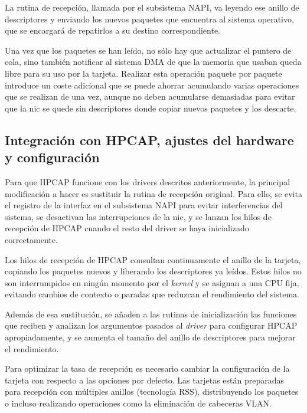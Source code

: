 \documentclass[twoside, 12pt, draft]{epstfg}
\begin{document}
La rutina de recepción, llamada por el subsistema \gls{NAPI}, va leyendo ese anillo de descriptores y enviando los nuevos paquetes que encuentra al sistema operativo, que se encargará de repatirlos a su destino correspondiente.

Una vez que los paquetes se han leído, no sólo hay que actualizar el puntero de cola, sino también notificar al sistema \gls{DMA} de que la memoria que usaban queda libre para su uso por la tarjeta. Realizar esta operación paquete por paquete introduce un coste adicional que se puede ahorrar acumulando varias operaciones que se realizan de una vez, aunque no deben acumularse demasiadas para evitar que la \gls{nic} se quede sin descriptores donde copiar nuevos paquetes y los descarte.


\subsection{Integración con HPCAP, ajustes del hardware y configuración}
\label{sec:Desarrollo:AjustesHardware}

Para que HPCAP funcione con los \glspl{driver} descritos anteriormente, la principal modificación a hacer es sustituir la rutina de recepción original. Para ello, se evita el registro de la interfaz en el subsistema \gls{NAPI} para evitar interferencias del sistema, se desactivan las interrupciones de la \gls{nic}, y se lanzan los hilos de recepción de HPCAP cuando el resto del \gls{driver} se haya inicializado correctamente.

Los hilos de recepción de HPCAP consultan continuamente el anillo de la tarjeta, copiando los paquetes nuevos y liberando los descriptores ya leídos. Estos hilos no son interrumpidos en ningún momento por el \textit{kernel} y se asignan a una CPU fija, evitando cambios de contexto o paradas que reduzcan el rendimiento del sistema.

Además de esa sustitución, se añaden a las rutinas de inicialización las funciones que reciben y analizan los argumentos pasados al \textit{driver} para configurar HPCAP apropiadamente, y se aumenta el tamaño del anillo de descriptores para mejorar el rendimiento.

Para optimizar la tasa de recepción es necesario cambiar la configuración de la tarjeta con respecto a las opciones por defecto. Las tarjetas están preparadas para recepción con múltiples anillos (tecnología \gls{RSS}), distribuyendo los paquetes o incluso realizando operaciones como la eliminación de cabeceras VLAN.
\end{document}
